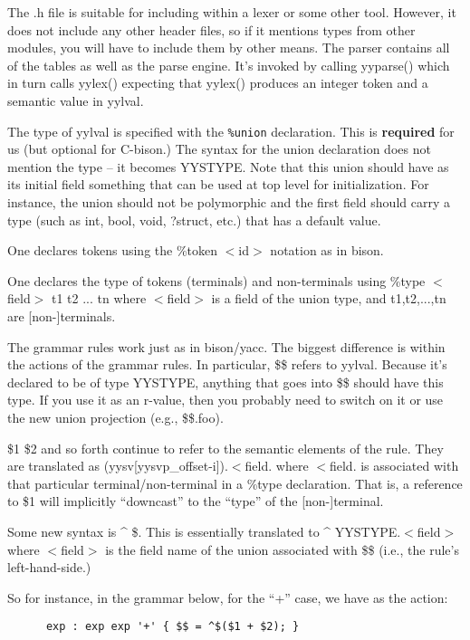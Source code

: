 \documentclass[titlepage,10pt]{article}
\begin{document}
The .h file is suitable for including within a lexer or some other tool.
However, it does not include any other header files, so if it mentions
types from other modules, you will have to include them by other means.
The parser contains all of the tables as well as the parse engine.  It's
invoked by calling yyparse() which in turn calls yylex() expecting that
yylex() produces an integer token and a semantic value in yylval.

The type of yylval is specified with the \texttt{\%union} declaration.
This is \textbf{required} for us (but optional for C-bison.)  The syntax
for the union declaration does not mention the type -- it becomes
YYSTYPE.  Note that this union should have as its initial field
something that can be used at top level for initialization.  For
instance, the union should not be polymorphic and the first field should
carry a type (such as int, bool, void, ?struct, etc.) that has a default
value.

One declares tokens using the \%token $<$id$>$ notation as in bison.

One declares the type of tokens (terminals) and non-terminals using
\%type $<$field$>$ t1 t2 ... tn where $<$field$>$ is a field of the
union type, and t1,t2,...,tn are [non-]terminals.

The grammar rules work just as in bison/yacc.  The biggest difference is
within the actions of the grammar rules.  In particular, \$\$ refers to
yylval.  Because it's declared to be of type YYSTYPE, anything that goes
into \$\$ should have this type.  If you use it as an r-value, then you
probably need to switch on it or use the new union projection (e.g.,
\$\$.foo).

\$1 \$2 and so forth continue to refer to the semantic elements of the
rule. They are translated as (yysv[yysvp{\_}offset-i]).$<$field$.$ where
$<$field$.$ is associated with that particular terminal/non-terminal in
a \%type declaration. That is, a reference to \$1 will implicitly
``downcast'' to the ``type'' of the [non-]terminal.

Some new syntax is \^{} \$.  This is essentially translated to
\^{} YYSTYPE.$<$field$>$ where $<$field$>$ is the field name of the union
associated with \$\$ (i.e., the rule's left-hand-side.)

So for instance, in the grammar below, for the ``+'' case, we have as
the action:


\begin{verbatim}
      exp : exp exp '+' { $$ = ^$($1 + $2); } 
\end{verbatim}
\end{document}
